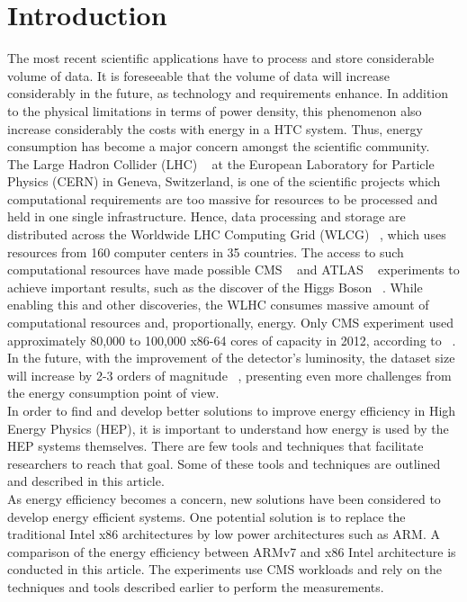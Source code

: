 \documentclass[a4paper]{jpconf}
\begin{document}
\section{Introduction}

 The most recent scientific applications have to process and store considerable 
volume of data. It is foreseeable that the volume of data will increase 
considerably in the future, as technology and requirements enhance. In addition
to the physical limitations in terms of power density, this phenomenon also
increase considerably the costs with energy in a HTC system. Thus, energy 
consumption has become a major concern amongst the scientific community. \\
 The Large Hadron Collider (LHC) ~\cite{LHCPAPER} at the European Laboratory for 
Particle Physics (CERN) in Geneva, Switzerland, is one of the scientific
projects which computational requirements are too massive for resources to be
 processed and held in one single infrastructure. Hence, data processing and 
storage 
are distributed across the Worldwide LHC Computing Grid (WLCG) ~\cite{WLHC}, 
which uses resources from 160 computer centers in 35 countries. The access to 
such computational resources have made possible CMS ~\cite{CMSDET} and ATLAS
 ~\cite{ATLAS} experiments to achieve important results, such as the discover of 
the Higgs Boson ~\cite{CMSHIGGS, ATLASHIGGS}. While enabling this and other
discoveries, the WLHC consumes massive amount of computational resources and, 
proportionally, energy. Only CMS experiment used approximately 80,000 to 100,000 
x86-64 cores of capacity in 2012, according to ~\cite{ACAT13ARM, CHEP13ARMPHI}.
In the future, with the improvement of the detector's luminosity, the dataset size
will increase by 2-3 orders of magnitude ~\cite{ACAT13ARM, CHEP13ARMPHI},
presenting even more challenges from the energy consumption point of view. \\

 In order to find and develop better solutions to improve energy efficiency in
High Energy Physics (HEP), it is
 important to understand how energy is used by the HEP systems themselves. There 
are 
few tools and techniques that facilitate researchers to reach that goal. Some of
these tools and techniques are outlined and described in this article.  \\
 As energy efficiency becomes a concern, new
solutions have been considered to develop energy efficient systems. One potential
solution is to replace the traditional Intel x86 architectures by low power
architectures such as ARM. A comparison of the energy efficiency between ARMv7 and 
x86 Intel architecture is conducted in this article. The experiments use CMS 
workloads and rely on the techniques and tools described earlier to perform the
measurements.\\
\end{document}
